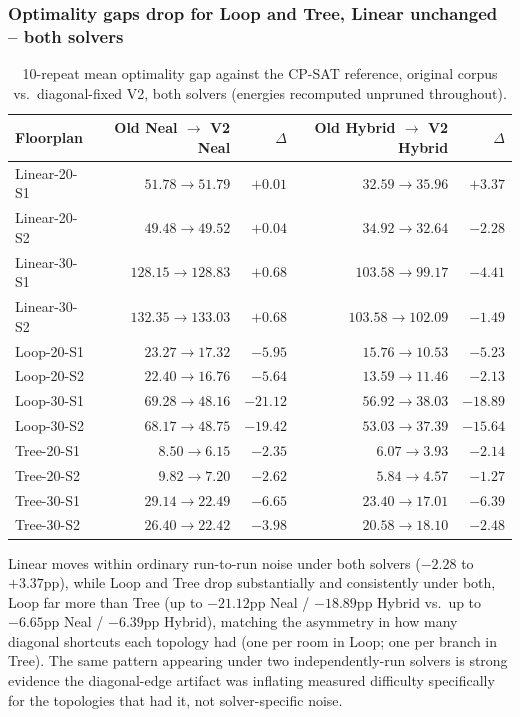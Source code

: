 \documentclass[11pt]{article}
\begin{document}
\subsubsection{Optimality gaps drop for Loop and Tree, Linear unchanged -- both solvers}

\begin{table}[h]
\centering
\caption{10-repeat mean optimality gap against the CP-SAT reference, original corpus vs.\ diagonal-fixed V2, both solvers (energies recomputed unpruned throughout).}
\label{tab:v4-gaps}
\small
\begin{tabular}{lrrrr}
\toprule
Floorplan & Old Neal $\to$ V2 Neal & $\Delta$ & Old Hybrid $\to$ V2 Hybrid & $\Delta$ \\
\midrule
Linear-20-S1 & $51.78 \to 51.79$ & $+0.01$ & $32.59 \to 35.96$ & $+3.37$ \\
Linear-20-S2 & $49.48 \to 49.52$ & $+0.04$ & $34.92 \to 32.64$ & $-2.28$ \\
Linear-30-S1 & $128.15 \to 128.83$ & $+0.68$ & $103.58 \to 99.17$ & $-4.41$ \\
Linear-30-S2 & $132.35 \to 133.03$ & $+0.68$ & $103.58 \to 102.09$ & $-1.49$ \\
Loop-20-S1 & $23.27 \to 17.32$ & $-5.95$ & $15.76 \to 10.53$ & $-5.23$ \\
Loop-20-S2 & $22.40 \to 16.76$ & $-5.64$ & $13.59 \to 11.46$ & $-2.13$ \\
Loop-30-S1 & $69.28 \to 48.16$ & $-21.12$ & $56.92 \to 38.03$ & $-18.89$ \\
Loop-30-S2 & $68.17 \to 48.75$ & $-19.42$ & $53.03 \to 37.39$ & $-15.64$ \\
Tree-20-S1 & $8.50 \to 6.15$ & $-2.35$ & $6.07 \to 3.93$ & $-2.14$ \\
Tree-20-S2 & $9.82 \to 7.20$ & $-2.62$ & $5.84 \to 4.57$ & $-1.27$ \\
Tree-30-S1 & $29.14 \to 22.49$ & $-6.65$ & $23.40 \to 17.01$ & $-6.39$ \\
Tree-30-S2 & $26.40 \to 22.42$ & $-3.98$ & $20.58 \to 18.10$ & $-2.48$ \\
\bottomrule
\end{tabular}
\end{table}

Linear moves within ordinary run-to-run noise under both solvers ($-2.28$ to $+3.37$pp), while Loop and Tree drop substantially and consistently under both, Loop far more than Tree (up to $-21.12$pp Neal / $-18.89$pp Hybrid vs.\ up to $-6.65$pp Neal / $-6.39$pp Hybrid), matching the asymmetry in how many diagonal shortcuts each topology had (one per room in Loop; one per branch in Tree). The same pattern appearing under two independently-run solvers is strong evidence the diagonal-edge artifact was inflating measured difficulty specifically for the topologies that had it, not solver-specific noise.
\end{document}
